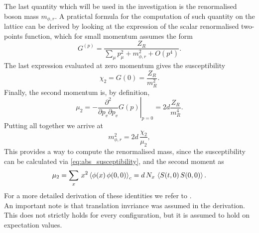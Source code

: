 The last quantity which will be used in the investigation is the renormalised boson mass $m_{\phi,r}$. A pratictal formula for the computation of such quantity on the lattice can be derived by looking at the expression of the scalar renormalised two-points function, which for small momentum assumes the form
\begin{equation*}
    G^(p)=\frac{Z_R}{\sum_\mu p_\mu^2+m_{\phi, r}^2+O\left(p^4\right)}.
\end{equation*}
The last expression evaluated at zero momentum gives the susceptibility 
\begin{equation*}
    \chi_2=G(0)=\frac{Z_R}{m_R^2}.
\end{equation*}
Finally, the second momentum is, by definition,
\begin{equation*}
    \mu_2=-\left.\frac{\partial^2}{\partial p_v \partial p_v} G(p)\right|_{p=0}=2 d \frac{Z_R}{m_R^4}.
\end{equation*}
Putting all together we arrive at
\begin{equation*}
    m_{\phi, r}^2 = 2d \, \frac{\chi_2}{\mu_2},
\end{equation*}
This provides a way to compute the renormalised mass, since the susceptibility can be calculated via \eqref{eq:abs_susceptibility}, and the second moment as 
\begin{equation*}
    \mu_2 = \sum_x \, x^2 \left\langle \phi(x) \, \phi(0,0) \right\rangle_c = d \, N_x \, \left\langle S(t,0) \, S(0,0) \right\rangle. 
\end{equation*}
For a more detailed derivation of these identities we refer to \cite{Pawlowski2017CoolingNoise}. \\
An important note is that translation invriance was assumed in the derivation. This does not strictly holds for every configuration, but it is assumed to hold on expectation values.